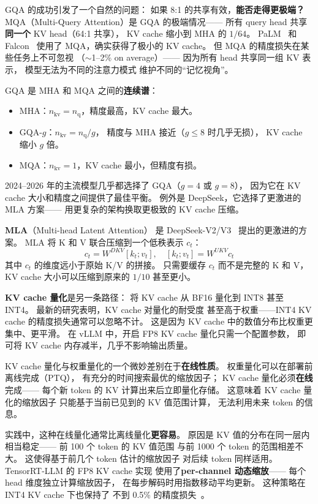 GQA 的成功引发了一个自然的问题：
如果 8:1 的共享有效，\textbf{能否走得更极端？}
MQA（Multi-Query Attention）是 GQA 的极端情况——
所有 query head 共享\textbf{同一个} KV head（64:1 共享），
KV cache 缩小到 MHA 的 $1/64$。
PaLM~\cite{chowdhery2022palm} 和 Falcon~\cite{penedo2023refinedweb}
使用了 MQA，确实获得了极小的 KV cache。
但 MQA 的精度损失在某些任务上不可忽视
（$\sim$1--2\% on average）——
因为所有 head 共享同一组 KV 表示，
模型无法为不同的注意力模式
维护不同的``记忆视角''。

GQA 是 MHA 和 MQA 之间的\textbf{连续谱}：
\begin{itemize}[noitemsep]
  \item MHA：$n_{\text{kv}} = n_{\text{q}}$，精度最高，KV cache 最大。
  \item GQA-$g$：$n_{\text{kv}} = n_{\text{q}} / g$，
        精度与 MHA 接近（$g \leq 8$ 时几乎无损），
        KV cache 缩小 $g$ 倍。
  \item MQA：$n_{\text{kv}} = 1$，KV cache 最小，但精度有损。
\end{itemize}
2024--2026 年的主流模型几乎都选择了 GQA（$g = 4$ 或 $g = 8$），
因为它在 KV cache 大小和精度之间提供了最佳平衡。
例外是 DeepSeek，它选择了更激进的 MLA 方案——
用更复杂的架构换取更极致的 KV cache 压缩。

\textbf{MLA}（Multi-head Latent Attention）
是 DeepSeek-V2/V3~\cite{deepseekv3} 提出的更激进的方案。
MLA 将 K 和 V 联合压缩到一个低秩表示 $c_t$：
\begin{equation}
  c_t = W^{DKV} [k_t; v_t], \quad
  [k_t; v_t] = W^{UKV} c_t
\end{equation}
其中 $c_t$ 的维度远小于原始 K/V 的拼接。
只需要缓存 $c_t$ 而不是完整的 K 和 V，
KV cache 大小可以压缩到原来的 $1/10$ 甚至更小。

\textbf{KV cache 量化}是另一条路径：
将 KV cache 从 BF16 量化到 INT8 甚至 INT4。
最新的研究表明，KV cache 对量化的耐受度
甚至高于权重——INT4 KV cache 的精度损失通常可以忽略不计。
这是因为 KV cache 中的数值分布比权重更集中、更平滑。
在 vLLM 中，开启 FP8 KV cache 量化只需一个配置参数，
即可将 KV cache 内存减半，几乎不影响输出质量。

KV cache 量化与权重量化的一个微妙差别在于\textbf{在线性质}。
权重量化可以在部署前离线完成（PTQ），
有充分的时间搜索最优的缩放因子；
KV cache 量化必须\textbf{在线}完成——
每个新 token 的 KV 计算出来后立即量化存储。
这意味着 KV cache 量化的缩放因子
只能基于当前已见到的 KV 值范围计算，
无法利用未来 token 的信息。

实践中，这种在线量化通常比离线量化\textbf{更容易}。
原因是 KV 值的分布在同一层内相当稳定——
前 100 个 token 的 KV 值范围
与前 1000 个 token 的范围相差不大。
这使得基于前几个 token 估计的缩放因子
对后续 token 同样适用。
TensorRT-LLM 的 FP8 KV cache 实现
使用了\textbf{per-channel 动态缩放}——
每个 head 维度独立计算缩放因子，
在每步解码时用指数移动平均更新。
这种策略在 INT4 KV cache 下也保持了
不到 0.5\% 的精度损失~\cite{hooper2024fp8}。


